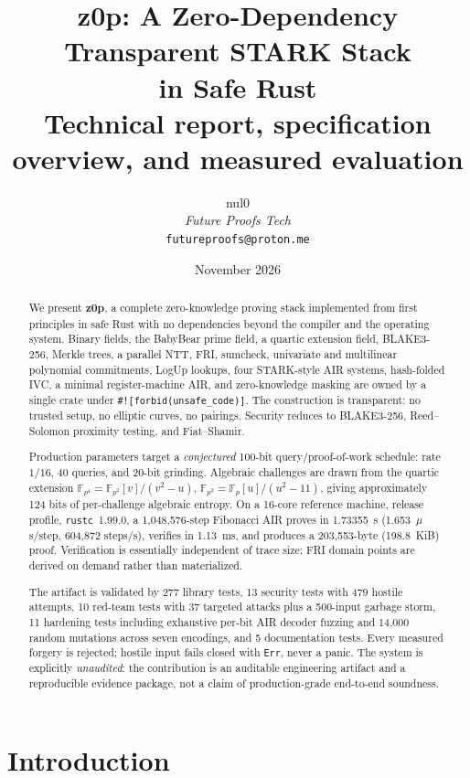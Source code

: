 \documentclass[11pt,a4paper]{article}
\title{\textbf{z0p: A Zero-Dependency Transparent STARK Stack\\in Safe Rust}\\[4pt]
\large Technical report, specification overview, and measured evaluation}
\author{nul0 \\ \textit{Future Proofs Tech} \\ \texttt{futureproofs@proton.me}}
\date{November 2026}
\newcommand{\zFp}{\mathbb{F}_p}
\newcommand{\zFpTwo}{\mathbb{F}_{p^2}}
\newcommand{\zFpFour}{\mathbb{F}_{p^4}}
\begin{document}
\maketitle

\begin{abstract}
We present \textbf{z0p}, a complete zero-knowledge proving stack implemented
from first principles in safe Rust with no dependencies beyond the compiler
and the operating system. Binary fields, the BabyBear prime field, a quartic
extension field, BLAKE3-256, Merkle trees, a parallel NTT, FRI, sumcheck,
univariate and multilinear polynomial commitments, LogUp lookups, four
STARK-style AIR systems, hash-folded IVC, a minimal register-machine AIR,
and zero-knowledge masking are owned by a single crate under
\texttt{\#![forbid(unsafe\_code)]}. The construction is transparent: no
trusted setup, no elliptic curves, no pairings. Security reduces to
BLAKE3-256, Reed--Solomon proximity testing, and Fiat--Shamir.

Production parameters target a \emph{conjectured} 100-bit
query/proof-of-work schedule: rate $1/16$, 40 queries, and 20-bit grinding.
Algebraic challenges are drawn from the quartic extension
$\zFpFour=\zFpTwo[v]/(v^2-u)$, $\zFpTwo=\zFp[u]/(u^2-11)$, giving approximately 124
bits of per-challenge algebraic entropy. On a 16-core reference machine,
release profile, \texttt{rustc}~1.99.0, a 1,048,576-step Fibonacci AIR
proves in 1.73355~s (1.653~$\mu$s/step, 604,872 steps/s), verifies in
1.13~ms, and produces a 203,553-byte (198.8~KiB) proof. Verification is
essentially independent of trace size: FRI domain points are derived on
demand rather than materialized.

The artifact is validated by 277 library tests, 13 security tests with 479
hostile attempts, 10 red-team tests with 37 targeted attacks plus a
500-input garbage storm, 11 hardening tests including exhaustive per-bit AIR
decoder fuzzing and 14,000 random mutations across seven encodings, and 5
documentation tests. Every measured forgery is rejected; hostile input fails
closed with \texttt{Err}, never a panic. The system is explicitly
\emph{unaudited}: the contribution is an auditable engineering artifact and a
reproducible evidence package, not a claim of production-grade end-to-end
soundness.
\end{abstract}

\tableofcontents

\section{Introduction}
\end{document}
